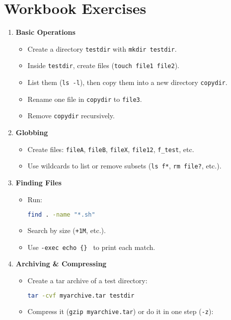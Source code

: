 \documentclass[a4paper]{report}
\begin{document}
\section*{Workbook Exercises}
\begin{enumerate}
    \item \textbf{Basic Operations}
    \begin{itemize}
        \item Create a directory \texttt{testdir} with \texttt{mkdir testdir}.
        \item Inside \texttt{testdir}, create files (\texttt{touch file1 file2}).
        \item List them (\texttt{ls -l}), then copy them into a new directory \texttt{copydir}.
        \item Rename one file in \texttt{copydir} to \texttt{file3}.
        \item Remove \texttt{copydir} recursively.
    \end{itemize}
    \item \textbf{Globbing}
    \begin{itemize}
        \item Create files: \texttt{fileA}, \texttt{fileB}, \texttt{fileX}, \texttt{file12}, \texttt{f\_test}, etc.
        \item Use wildcards to list or remove subsets (\texttt{ls f*}, \texttt{rm file?}, etc.).
    \end{itemize}
    \item \textbf{Finding Files}
    \begin{itemize}
        \item Run:
\begin{lstlisting}[language=bash]
find . -name "*.sh"
\end{lstlisting}
        \item Search by size (\texttt{+1M}, etc.).
        \item Use \texttt{-exec echo \{\} \;} to print each match.
    \end{itemize}
    \item \textbf{Archiving \& Compressing}
    \begin{itemize}
        \item Create a tar archive of a test directory:
\begin{lstlisting}[language=bash]
tar -cvf myarchive.tar testdir
\end{lstlisting}
        \item Compress it (\texttt{gzip myarchive.tar}) or do it in one step (\texttt{-z}):

\end{itemize}
\end{enumerate}
\end{document}
